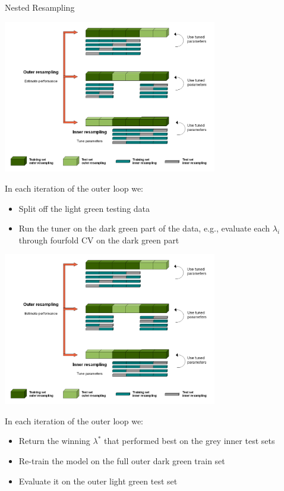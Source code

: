 \documentclass[11pt,compress,t,notes=noshow, xcolor=table]{beamer}
\begin{document}
\begin{vbframe}{Nested Resampling}
\begin{center}\includegraphics[width = 0.7\textwidth]{figure_man/Nested_Resampling.png}\end{center}

\framebreak

\begin{footnotesize}
In each iteration of the outer loop we:
\begin{itemize}
\item Split off the light green testing data
\item Run the tuner on the dark green part of the data, e.g.,
  evaluate each $\lambda_i$ through fourfold CV on the dark green part
\end{itemize}
\end{footnotesize}

\begin{center}\includegraphics[width = 0.7\textwidth]{figure_man/Nested_Resampling.png}\end{center}

\framebreak

\begin{footnotesize}
In each iteration of the outer loop we:
\begin{itemize}
\item Return the winning $\lambda^*$ that performed best on the grey inner test sets
\item Re-train the model on the full outer dark green train set
\item Evaluate it on the outer light green test set
\end{itemize}
\end{footnotesize}


\end{vbframe}
\end{document}
